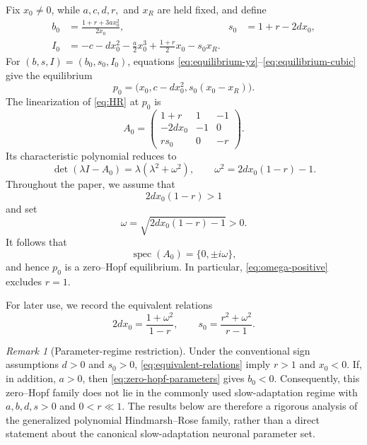 \documentclass[11pt]{amsart}
\theoremstyle{remark}
\newtheorem{remark}[theorem]{Remark}
\newcommand{\spec}{\operatorname{spec}}
\begin{document}
Fix \(x_0\ne0\), while \(a,c,d,r,\) and \(x_R\) are held fixed, and define
\begin{equation}\label{eq:zero-hopf-parameters}
\begin{aligned}
b_0&=\frac{1+r+3ax_0^2}{2x_0},&
s_0&=1+r-2dx_0,\\
I_0&=-c-dx_0^2-\frac{a}{2}x_0^3+\frac{1+r}{2}x_0-s_0x_R.
\end{aligned}
\end{equation}
For \((b,s,I)=(b_0,s_0,I_0)\), equations
\eqref{eq:equilibrium-yz}--\eqref{eq:equilibrium-cubic} give the equilibrium
\begin{equation}\label{eq:p0}
 p_0=\bigl(x_0,c-dx_0^2,s_0(x_0-x_R)\bigr).
\end{equation}
The linearization of \eqref{eq:HR} at \(p_0\) is
\begin{equation}\label{eq:A0}
 A_0=
 \begin{pmatrix}
 1+r&1&-1\\
 -2dx_0&-1&0\\
 rs_0&0&-r
 \end{pmatrix}.
\end{equation}
Its characteristic polynomial reduces to
\begin{equation}\label{eq:characteristic}
 \det(\lambda I-A_0)=\lambda(\lambda^2+\omega^2),
 \qquad
 \omega^2=2dx_0(1-r)-1.
\end{equation}
Throughout the paper, we assume that
\begin{equation}\label{eq:omega-positive}
 2dx_0(1-r)>1
\end{equation}
and set
\begin{equation}\label{eq:omega}
 \omega=\sqrt{2dx_0(1-r)-1}>0.
\end{equation}
It follows that
\[
 \spec(A_0)=\{0,\pm i\omega\},
\]
and hence \(p_0\) is a zero--Hopf equilibrium.  In particular,
\eqref{eq:omega-positive} excludes \(r=1\).

For later use, we record the equivalent relations
\begin{equation}\label{eq:equivalent-relations}
 2dx_0=\frac{1+\omega^2}{1-r},
 \qquad
 s_0=\frac{r^2+\omega^2}{r-1}.
\end{equation}

\begin{remark}[Parameter-regime restriction]\label{rem:parameter-regime}
Under the conventional sign assumptions \(d>0\) and \(s_0>0\),
\eqref{eq:equivalent-relations} imply \(r>1\) and \(x_0<0\).  If, in
addition, \(a>0\), then \eqref{eq:zero-hopf-parameters} gives \(b_0<0\).
Consequently, this zero--Hopf family does not lie in the commonly used
slow-adaptation regime with \(a,b,d,s>0\) and \(0<r\ll1\).  The results below
are therefore a rigorous analysis of the generalized polynomial
Hindmarsh--Rose family, rather than a direct statement about the canonical
slow-adaptation neuronal parameter set.
\end{remark}
\end{document}
